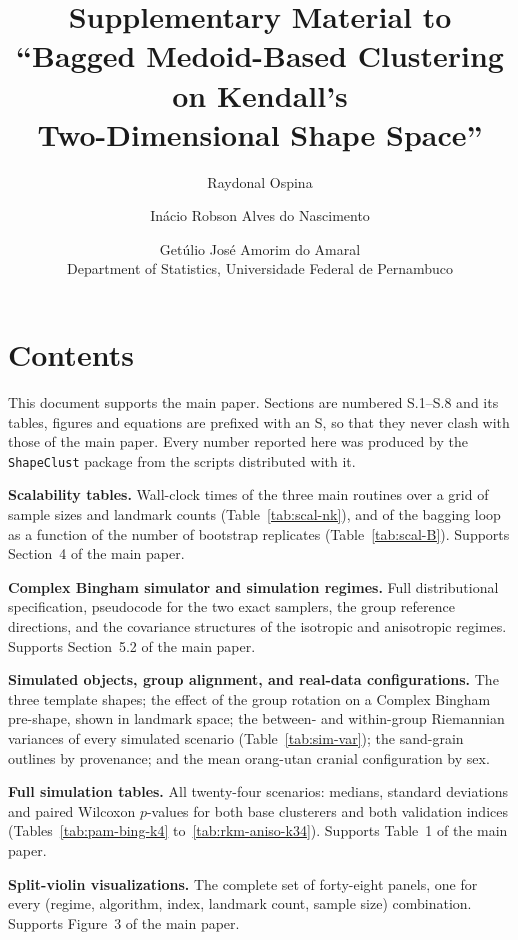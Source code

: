 \documentclass[11pt,a4paper]{article}
\title{Supplementary Material to\\
       ``Bagged Medoid-Based Clustering on Kendall's\\
       Two-Dimensional Shape Space''}
\author{Raydonal Ospina \and
        In\'{a}cio Robson Alves do Nascimento \and
        Get\'{u}lio Jos\'{e} Amorim do Amaral\\[0.3em]
        \small Department of Statistics, Universidade Federal de Pernambuco}
\date{}
\begin{document}
\maketitle

\section*{Contents}

This document supports the main paper. Sections are numbered S.1--S.8 and its
tables, figures and equations are prefixed with an S, so that they never clash
with those of the main paper. Every number reported here was produced by the
\texttt{ShapeClust} package from the scripts distributed with it.

\begin{description}[leftmargin=2.1cm, style=nextline]

\item[Section S.1] \textbf{Scalability tables.} Wall-clock times of the three
  main routines over a grid of sample sizes and landmark counts
  (Table~\ref{tab:scal-nk}), and of the bagging loop as a function of the number
  of bootstrap replicates (Table~\ref{tab:scal-B}). Supports Section~4 of the
  main paper.

\item[Section S.2] \textbf{Complex Bingham simulator and simulation regimes.}
  Full distributional specification, pseudocode for the two exact samplers, the
  group reference directions, and the covariance structures of the isotropic and
  anisotropic regimes. Supports Section~5.2 of the main paper.

\item[Section S.3] \textbf{Simulated objects, group alignment, and real-data
  configurations.} The three template shapes; the effect of the group rotation on
  a Complex Bingham pre-shape, shown in landmark space; the between- and
  within-group Riemannian variances of every simulated scenario
  (Table~\ref{tab:sim-var}); the sand-grain outlines by provenance; and the mean
  orang-utan cranial configuration by sex.

\item[Section S.4] \textbf{Full simulation tables.} All twenty-four scenarios:
  medians, standard deviations and paired Wilcoxon $p$-values for both base
  clusterers and both validation indices (Tables~\ref{tab:pam-bing-k4}
  to~\ref{tab:rkm-aniso-k34}). Supports Table~1 of the main paper.

\item[Section S.5] \textbf{Split-violin visualizations.} The complete set of
  forty-eight panels, one for every (regime, algorithm, index, landmark count,
  sample size) combination. Supports Figure~3 of the main paper.


\end{description}
\end{document}
